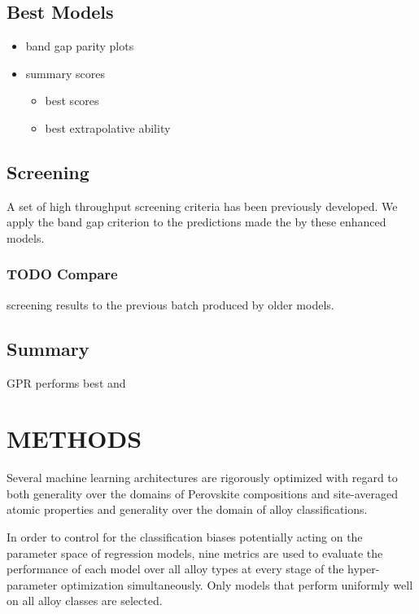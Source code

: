 \documentclass[aip, jmp, amsmath, amssymb]{revtex4-2}
\begin{document}
\subsection*{Best Models}
\label{sec:org5a13d7b}
\begin{itemize}
\item band gap parity plots
\item summary scores
\begin{itemize}
\item best scores
\item best extrapolative ability
\end{itemize}
\end{itemize}

\subsection*{Screening}
\label{sec:orgafa81a1}
A set of high throughput screening criteria has been previously
developed\cite{mannodi-kanakkithodi-2022-data-driven}. We apply the
band gap criterion to the predictions made the by these enhanced models.

\subsubsection*{{\bfseries\sffamily TODO} Compare}
\label{sec:orgc7e48b2}
screening results to the previous batch produced by older models.

\subsection*{Summary}
\label{sec:orgbc53911}
GPR performs best and

\section*{METHODS}
\label{sec:org6992cbf}
Several machine learning architectures are rigorously optimized with
regard to both generality over the domains of Perovskite compositions
and site-averaged atomic properties and generality over the domain of
alloy classifications.

In order to control for the classification biases potentially acting
on the parameter space of regression models, nine metrics are used to
evaluate the performance of each model over all alloy types at every
stage of the hyper-parameter optimization simultaneously. Only models
that perform uniformly well on all alloy classes are selected.
\end{document}
